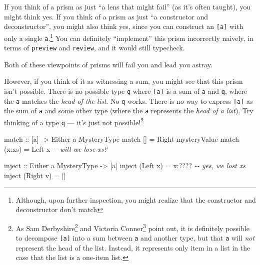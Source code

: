 \documentclass[]{article}
\newenvironment{Shaded}{}{}
\newcommand{\CommentTok}[1]{\textcolor[rgb]{0.38,0.63,0.69}{\textit{#1}}}
\newcommand{\DataTypeTok}[1]{\textcolor[rgb]{0.56,0.13,0.00}{#1}}
\newcommand{\NormalTok}[1]{#1}
\newcommand{\OperatorTok}[1]{\textcolor[rgb]{0.40,0.40,0.40}{#1}}
\newcommand{\OtherTok}[1]{\textcolor[rgb]{0.00,0.44,0.13}{#1}}
\renewcommand{\href}[2]{#2\footnote{\url{#1}}}
\begin{document}
If you think of a prism as just ``a lens that might fail'' (as it's often
taught), you might think yes. If you think of a prism as just ``a constructor
and deconstructor'', you might also think yes, since you can construct an
\texttt{{[}a{]}} with only a single \texttt{a}.\footnote{Although, upon further
  inspection, you might realize that the constructor and deconstructor don't
  match} You can definitely ``implement'' this prism incorrectly naively, in
terms of \texttt{preview} and \texttt{review}, and it would still typecheck.

Both of these viewpoints of prisms will fail you and lead you astray.

However, if you think of it as witnessing a sum, you might see that this prism
isn't possible. There is no possible type \texttt{q} where \texttt{{[}a{]}} is a
sum of \texttt{a} and \texttt{q}, where the \texttt{a} matches the \emph{head of
the list}. No \texttt{q} works. There is no way to express \texttt{{[}a{]}} as
the sum of \texttt{a} and some other type (where the \texttt{a} represents the
\emph{head of a list}). Try thinking of a type \texttt{q} --- it's just not
possible!\footnote{As
  \href{https://twitter.com/samderbyshire/status/1006290478395019265}{Sam
  Derbyshire} and \href{http://disq.us/p/1t5xi3w}{Victoria Conner} point out, it
  is definitely possible to decompose \texttt{{[}a{]}} into a sum between
  \texttt{a} and another type, but that \texttt{a} will \emph{not} represent the
  head of the list. Instead, it represents only item in a list in the case that
  the list is a one-item list.}

\begin{Shaded}
\begin{Highlighting}[]
\OtherTok{match ::}\NormalTok{ [a] }\OtherTok{{-}>} \DataTypeTok{Either}\NormalTok{ a }\DataTypeTok{MysteryType}
\NormalTok{match []     }\OtherTok{=} \DataTypeTok{Right}\NormalTok{ mysteryValue}
\NormalTok{match (x}\OperatorTok{:}\NormalTok{xs) }\OtherTok{=} \DataTypeTok{Left}\NormalTok{ x                       }\CommentTok{{-}{-} will we lose \textasciigrave{}xs\textasciigrave{}?}

\OtherTok{inject ::} \DataTypeTok{Either}\NormalTok{ a }\DataTypeTok{MysteryType} \OtherTok{{-}>}\NormalTok{ [a]}
\NormalTok{inject (}\DataTypeTok{Left}\NormalTok{ x)  }\OtherTok{=}\NormalTok{ x}\OperatorTok{:????}                   \CommentTok{{-}{-} yes, we lost \textasciigrave{}xs\textasciigrave{}}
\NormalTok{inject (}\DataTypeTok{Right}\NormalTok{ v) }\OtherTok{=}\NormalTok{ []}
\end{Highlighting}
\end{Shaded}
\end{document}
